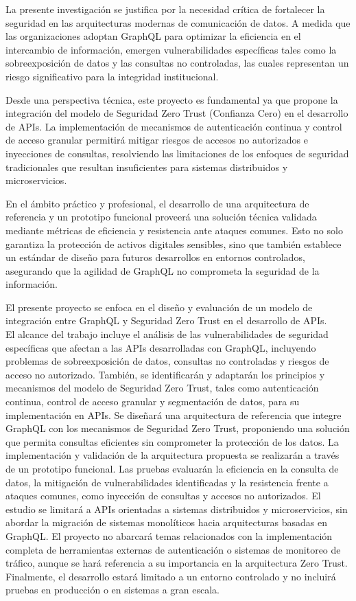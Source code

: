\documentclass[12pt]{article}
\begin{document}
{\color{blue} La presente investigación se justifica por la necesidad crítica de fortalecer la seguridad en las arquitecturas modernas de comunicación de datos. A medida que las organizaciones adoptan GraphQL para optimizar la eficiencia en el intercambio de información, emergen vulnerabilidades específicas tales como la sobreexposición de datos y las consultas no controladas, las cuales representan un riesgo significativo para la integridad institucional.

Desde una perspectiva técnica, este proyecto es fundamental ya que propone la integración del modelo de Seguridad Zero Trust (Confianza Cero) en el desarrollo de APIs. La implementación de mecanismos de autenticación continua y control de acceso granular permitirá mitigar riesgos de accesos no autorizados e inyecciones de consultas, resolviendo las limitaciones de los enfoques de seguridad tradicionales que resultan insuficientes para sistemas distribuidos y microservicios.

En el ámbito práctico y profesional, el desarrollo de una arquitectura de referencia y un prototipo funcional proveerá una solución técnica validada mediante métricas de eficiencia y resistencia ante ataques comunes. Esto no solo garantiza la protección de activos digitales sensibles, sino que también establece un estándar de diseño para futuros desarrollos en entornos controlados, asegurando que la agilidad de GraphQL no comprometa la seguridad de la información.}

{\color{orange} El presente proyecto se enfoca en el diseño y evaluación de un modelo de integración entre GraphQL y Seguridad Zero Trust en el desarrollo de APIs.\\
El alcance del trabajo incluye el análisis de las vulnerabilidades de seguridad específicas que afectan a las APIs desarrolladas con GraphQL, incluyendo problemas de sobreexposición de datos, consultas no controladas y riesgos de acceso no autorizado. También, se identificarán y adaptarán los principios y mecanismos del modelo de Seguridad Zero Trust, tales como autenticación continua, control de acceso granular y segmentación de datos, para su implementación en APIs. Se diseñará una arquitectura de referencia que integre GraphQL con los mecanismos de Seguridad Zero Trust, proponiendo una solución que permita consultas eficientes sin comprometer la protección de los datos. La implementación y validación de la arquitectura propuesta se realizarán a través de un prototipo funcional. Las pruebas evaluarán la eficiencia en la consulta de datos, la mitigación de vulnerabilidades identificadas y la resistencia frente a ataques comunes, como inyección de consultas y accesos no autorizados. El estudio se limitará a APIs orientadas a sistemas distribuidos y microservicios, sin abordar la migración de sistemas monolíticos hacia arquitecturas basadas en GraphQL. El proyecto no abarcará temas relacionados con la implementación completa de herramientas externas de autenticación o sistemas de monitoreo de tráfico, aunque se hará referencia a su importancia en la arquitectura Zero Trust. Finalmente, el desarrollo estará limitado a un entorno controlado y no incluirá pruebas en producción o en sistemas a gran escala.}
\end{document}
